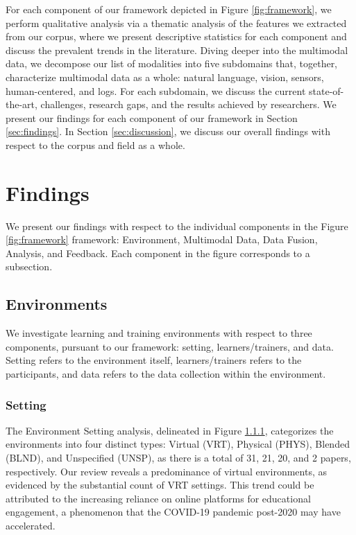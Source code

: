 \documentclass[manuscript,screen,review]{acmart}
\begin{document}
For each component of our framework depicted in Figure \ref{fig:framework}, we perform qualitative analysis via a thematic analysis of the features we extracted from our corpus, where we present descriptive statistics for each component and discuss the prevalent trends in the literature. Diving deeper into the multimodal data, we decompose our list of modalities into five subdomains that, together, characterize multimodal data as a whole: natural language, vision, sensors, human-centered, and logs. For each subdomain, we discuss the current state-of-the-art, challenges, research gaps, and the results achieved by researchers. We present our findings for each component of our framework in Section \ref{sec:findings}. In Section \ref{sec:discussion}, we discuss our overall findings with respect to the corpus and field as a whole.

\section{Findings}
We present our findings with respect to the individual components in the Figure \ref{fig:framework} framework: Environment, Multimodal Data, Data Fusion, Analysis, and Feedback. Each component in the figure corresponds to a subsection. 

\subsection{Environments}
We investigate learning and training environments with respect to three components, pursuant to our framework: setting, learners/trainers, and data. Setting refers to the environment itself, learners/trainers refers to the participants, and data refers to the data collection within the environment.

\subsubsection{Setting}


The Environment Setting analysis, delineated in Figure \ref{}, categorizes the environments into four distinct types: Virtual (VRT), Physical (PHYS), Blended (BLND), and Unspecified (UNSP), as there is a total of 31, 21, 20, and 2 papers, respectively. Our review reveals a predominance of virtual environments, as evidenced by the substantial count of VRT settings. This trend could be attributed to the increasing reliance on online platforms for educational engagement, a phenomenon that the COVID-19 pandemic post-2020 may have accelerated.
\end{document}
